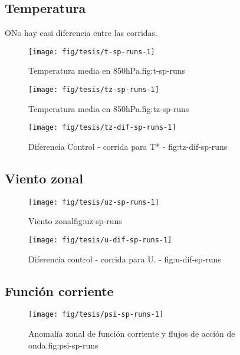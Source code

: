 \documentclass[spanish,a4paper]{book}
\begin{document}
\subsection{Temperatura}\label{temperatura-2}

ONo hay casi diferencia entre las corridas.

\begin{figure}
\texttt{[image: fig/tesis/t-sp-runs-1]} \caption{Temperatura media en 850hPa.{fig:t-sp-runs}}\label{fig:t-sp-runs}
\end{figure}

\begin{figure}
\texttt{[image: fig/tesis/tz-sp-runs-1]} \caption{Temperatura media en 850hPa.{fig:tz-sp-runs}}\label{fig:tz-sp-runs}
\end{figure}

\begin{figure}

{\centering \texttt{[image: fig/tesis/tz-dif-sp-runs-1]} 

}

\caption{Diferencia Control - corrida para T* - fig:tz-dif-sp-runs}\label{fig:tz-dif-sp-runs}
\end{figure}

\subsection{Viento zonal}\label{viento-zonal-2}

\begin{figure}

{\centering \texttt{[image: fig/tesis/uz-sp-runs-1]} 

}

\caption{Viento zonal{fig:uz-sp-runs}}\label{fig:uz-sp-runs}
\end{figure}

\begin{figure}
\texttt{[image: fig/tesis/u-dif-sp-runs-1]} \caption{Diferencia control - corrida para U. - fig:u-dif-sp-runs}\label{fig:u-dif-sp-runs}
\end{figure}

\subsection{Función corriente}\label{funcion-corriente-3}

\begin{figure}

{\centering \texttt{[image: fig/tesis/psi-sp-runs-1]} 

}

\caption{Anomalía zonal de función corriente y flujos de acción de onda.{fig:psi-sp-runs}}\label{fig:psi-sp-runs}
\end{figure}
\end{document}

